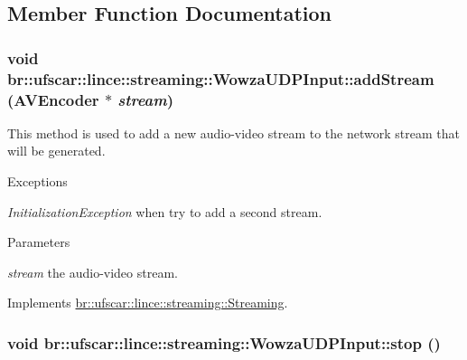 \subsection{Member Function Documentation}
\hypertarget{classbr_1_1ufscar_1_1lince_1_1streaming_1_1WowzaUDPInput_a0b9876d39a409092f24b5b291a410b90}{
\subsubsection[{addStream}]{\setlength{\rightskip}{0pt plus 5cm}void br::ufscar::lince::streaming::WowzaUDPInput::addStream ({\bf AVEncoder} $\ast$ {\em stream})}}
\label{classbr_1_1ufscar_1_1lince_1_1streaming_1_1WowzaUDPInput_a0b9876d39a409092f24b5b291a410b90}


This method is used to add a new audio-\/video stream to the network stream that will be generated. 


\begin{DoxyExceptions}{Exceptions}
\item[{\em InitializationException}]when try to add a second stream. \end{DoxyExceptions}

\begin{DoxyParams}{Parameters}
\item[{\em stream}]the audio-\/video stream. \end{DoxyParams}


Implements \hyperlink{classbr_1_1ufscar_1_1lince_1_1streaming_1_1Streaming_ab2739b46d9bd285d4d64100b9d5bb796}{br::ufscar::lince::streaming::Streaming}.

\hypertarget{classbr_1_1ufscar_1_1lince_1_1streaming_1_1WowzaUDPInput_a90d2675c73c201ed7bc54d64e419f5a8}{
\subsubsection[{stop}]{\setlength{\rightskip}{0pt plus 5cm}void br::ufscar::lince::streaming::WowzaUDPInput::stop ()}}
\label{classbr_1_1ufscar_1_1lince_1_1streaming_1_1WowzaUDPInput_a90d2675c73c201ed7bc54d64e419f5a8}


